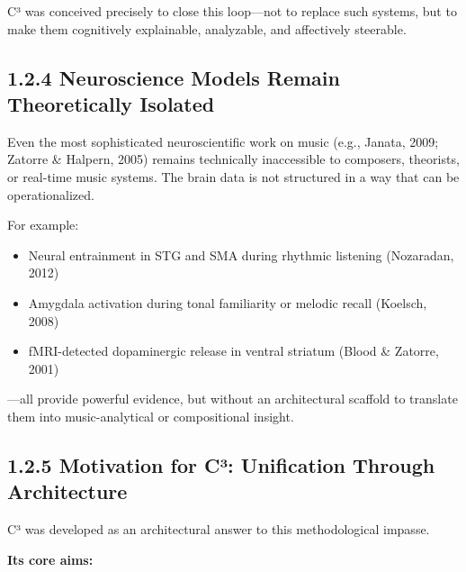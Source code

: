 C³ was conceived precisely to close this loop—not to replace such systems, but to make them cognitively explainable, analyzable, and affectively steerable.

\subsection*{1.2.4 Neuroscience Models Remain Theoretically Isolated}

Even the most sophisticated neuroscientific work on music (e.g., Janata, 2009; Zatorre \& Halpern, 2005) remains technically inaccessible to composers, theorists, or real-time music systems. The brain data is not structured in a way that can be operationalized.

For example:

\begin{itemize}
    \item Neural entrainment in STG and SMA during rhythmic listening (Nozaradan, 2012)
    \item Amygdala activation during tonal familiarity or melodic recall (Koelsch, 2008)
    \item fMRI-detected dopaminergic release in ventral striatum (Blood \& Zatorre, 2001)
\end{itemize}

—all provide powerful evidence, but without an architectural scaffold to translate them into music-analytical or compositional insight.

\subsection*{1.2.5 Motivation for C³: Unification Through Architecture}

C³ was developed as an architectural answer to this methodological impasse.

\textbf{Its core aims:}

